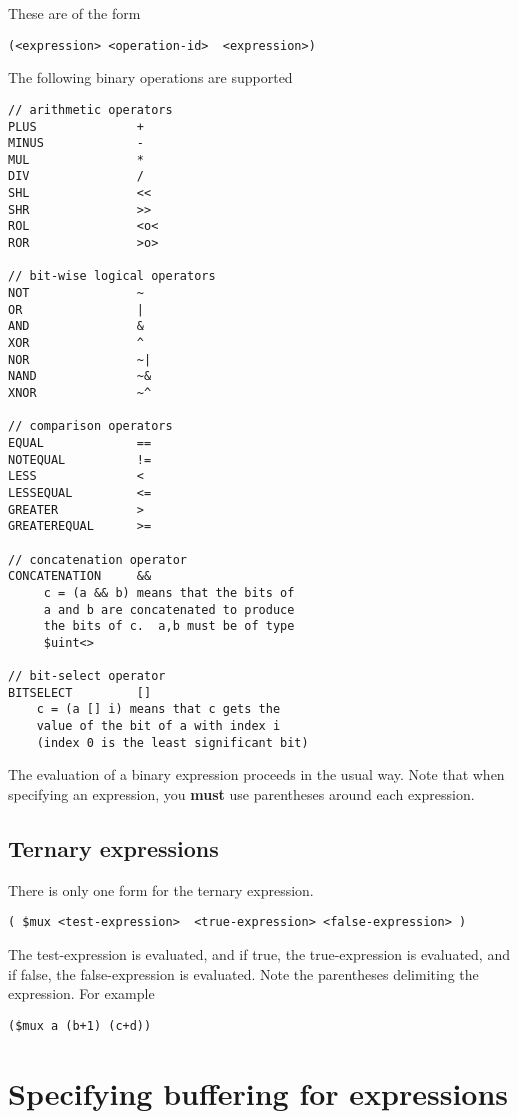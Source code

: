 \documentclass{article}
\begin{document}
These are of the
form
\begin{verbatim}
(<expression> <operation-id>  <expression>)
\end{verbatim}
The following binary operations are supported
\begin{verbatim}
// arithmetic operators
PLUS              + 
MINUS             - 
MUL               * 
DIV               / 
SHL               <<
SHR               >> 
ROL               <o<
ROR               >o> 

// bit-wise logical operators
NOT               ~     
OR                |     
AND               &    
XOR               ^   
NOR               ~|     
NAND              ~&    
XNOR              ~^   

// comparison operators
EQUAL             ==
NOTEQUAL          !=
LESS              < 
LESSEQUAL         <=
GREATER           > 
GREATEREQUAL      >=

// concatenation operator
CONCATENATION     &&
     c = (a && b) means that the bits of
     a and b are concatenated to produce
     the bits of c.  a,b must be of type
     $uint<>

// bit-select operator
BITSELECT         []
    c = (a [] i) means that c gets the
    value of the bit of a with index i 
    (index 0 is the least significant bit)
\end{verbatim}
The evaluation of a binary expression proceeds in
the usual way.  Note that when specifying an 
expression, you {\bf must} use parentheses around
each expression.

\subsection{Ternary expressions}

There is only one
form for the ternary expression.
\begin{verbatim}
( $mux <test-expression>  <true-expression> <false-expression> )
\end{verbatim}%
The test-expression is evaluated, and if true, the true-expression
is evaluated, and if false, the false-expression is evaluated.
Note the parentheses delimiting the expression.
For example
\begin{verbatim}
($mux a (b+1) (c+d))
\end{verbatim}



\section{Specifying buffering for expressions}
\end{document}
